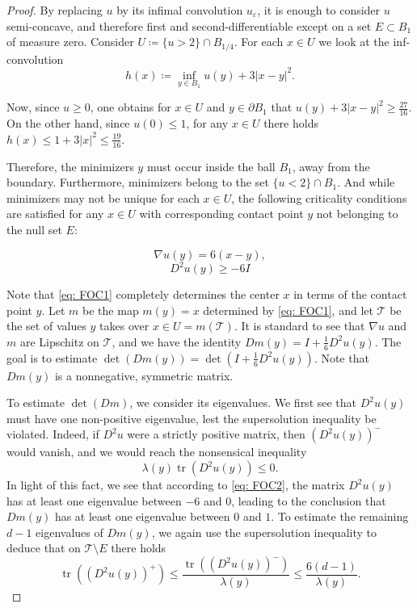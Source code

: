 \documentclass[reqno]{amsart}
\numberwithin{equation}{section}
\numberwithin{equation}{section}
\newcommand{\eps}{\varepsilon}
\newcommand{\ds}{\displaystyle}
\DeclareMathOperator{\tr}{tr}
\begin{document}
\begin{proof}
By replacing $u$ by its infimal convolution $u_\eps$, it is enough to consider $u$ semi-concave, and therefore first and second-differentiable except on a set $E\subset B_1$ of measure zero. Consider $U \coloneqq \{u>2\} \cap B_{1/4}$. For each $x \in U$ we look at the inf-convolution 
$$h(x) \ds \coloneqq  \inf_{y \in B_1} u(y) + 3|x-y|^2.$$

Now, since $u \ge 0$, one obtains for $x \in U$ and $y \in \partial B_1$ that $u(y) + 3|x-y|^2 \ge \frac{27}{16}.$ On the other hand, since $u(0)\le 1$, for any $x \in U$ there holds $h(x) \le 1+ 3|x|^2 \le \frac{19}{16}.$

Therefore, the minimizers $y$ must occur inside the ball $B_1$, away from the boundary. Furthermore, minimizers belong to the set $\{u<2\} \cap B_1$. And while minimizers may not be unique for each $x \in U$, the following criticality conditions are satisfied for any $x \in U$ with corresponding contact point $y$ not belonging to the null set $E$:


\begin{equation}
\label{eq: FOC1}
\nabla u(y) = 6(x-y),
\end{equation}
\begin{equation}
\label{eq: FOC2}
D^2u(y) \ge -6I
\end{equation}

Note that \eqref{eq: FOC1} completely determines the center $x$ in terms of the contact point $y$. 
Let $m$ be the map $m(y)=x$ determined by \eqref{eq: FOC1}, and let $\mathcal{T}$ be the set of values $y$ takes over $x \in U = m(\mathcal{T})$. It is standard to see that $\nabla u$ and $m$ are Lipschitz on $\mathcal{T}$, and we have the identity $Dm(y) = I + \frac16 D^2u(y)$. The goal is to estimate $\det(Dm(y)) = \det(I + \frac{1}{6}D^2u(y))$. Note that $Dm(y)$ is a nonnegative, symmetric matrix. 

To estimate $\det(Dm)$, we consider its eigenvalues. We first see that $D^2u(y)$ must have one non-positive eigenvalue, lest the supersolution inequality be violated. Indeed, if $D^2u$ were a strictly positive matrix, then $(D^2u(y))^-$ would vanish, and we would reach the nonsensical inequality
$$\lambda(y) \tr(D^2u(y)) \le 0.$$
In light of this fact, we see that according to \eqref{eq: FOC2}, the matrix $D^2u(y)$ has at least one eigenvalue between $-6$ and $0$, leading to the conclusion that $Dm(y)$ has at least one eigenvalue between $0$ and $1$. To estimate the remaining $d-1$ eigenvalues of $Dm(y)$, we again use the supersolution inequality to deduce that on $\mathcal{T}\setminus E$ there holds
$$\tr((D^2u(y))^+) \le \frac{\tr((D^2u(y))^-)}{\lambda(y)} \le \frac{6(d-1)}{\lambda(y)}.$$ 


\end{proof}
\end{document}
